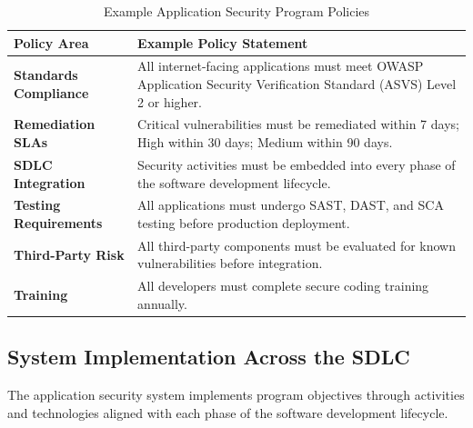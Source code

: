 \documentclass[11pt,letterpaper]{article}
\begin{document}
\begin{table}[H]
\centering
\renewcommand{\arraystretch}{1.3}
\begin{tabularx}{\textwidth}{>{\bfseries}p{3cm} X}
\toprule
\textbf{Policy Area} & \textbf{Example Policy Statement} \\
\midrule
Standards Compliance & All internet-facing applications must meet OWASP Application Security Verification Standard (ASVS) Level 2 or higher. \\
Remediation SLAs & Critical vulnerabilities must be remediated within 7 days; High within 30 days; Medium within 90 days. \\
SDLC Integration & Security activities must be embedded into every phase of the software development lifecycle. \\
Testing Requirements & All applications must undergo SAST, DAST, and SCA testing before production deployment. \\
Third-Party Risk & All third-party components must be evaluated for known vulnerabilities before integration. \\
Training & All developers must complete secure coding training annually. \\
\bottomrule
\end{tabularx}
\caption{Example Application Security Program Policies}
\label{tab:security-policies}
\end{table}

\subsection{System Implementation Across the SDLC}

The application security system implements program objectives through activities and technologies aligned with each phase of the software development lifecycle.
\end{document}
